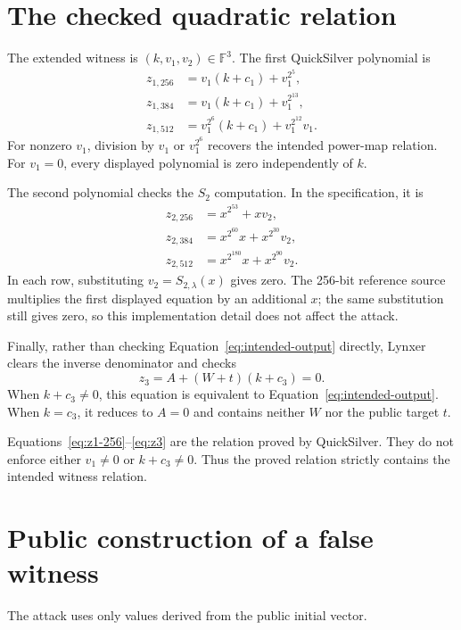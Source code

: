 \documentclass[11pt,a4paper]{article}
\newcommand{\F}{\mathbb{F}}
\begin{document}
\section{The checked quadratic relation}

The extended witness is $(k,v_1,v_2)\in\F^3$.  The first QuickSilver polynomial is
\begin{align}
 z_{1,256} &= v_1(k+c_1)+v_1^{2^5}, \label{eq:z1-256}\\
 z_{1,384} &= v_1(k+c_1)+v_1^{2^{13}}, \label{eq:z1-384}\\
 z_{1,512} &= v_1^{2^6}(k+c_1)+v_1^{2^{12}}v_1. \label{eq:z1-512}
\end{align}
For nonzero $v_1$, division by $v_1$ or $v_1^{2^6}$ recovers the intended power-map
relation.  For $v_1=0$, every displayed polynomial is zero independently of $k$.

The second polynomial checks the $S_2$ computation.  In the specification, it is
\begin{align}
 z_{2,256} &= x^{2^{53}}+xv_2, \\
 z_{2,384} &= x^{2^{60}}x+x^{2^{30}}v_2, \\
 z_{2,512} &= x^{2^{180}}x+x^{2^{90}}v_2. \label{eq:z2}
\end{align}
In each row, substituting $v_2=S_{2,\lambda}(x)$ gives zero.  The 256-bit reference source multiplies the first displayed equation by an additional $x$;
the same substitution still gives zero, so this implementation detail does not affect the
attack.

Finally, rather than checking Equation~\eqref{eq:intended-output} directly, Lynxer clears
the inverse denominator and checks
\begin{equation}
 z_3=A+(W+t)(k+c_3)=0.
 \label{eq:z3}
\end{equation}
When $k+c_3\neq0$, this equation is equivalent to Equation~\eqref{eq:intended-output}.
When $k=c_3$, it reduces to $A=0$ and contains neither $W$ nor the public target $t$.

Equations~\eqref{eq:z1-256}--\eqref{eq:z3} are the relation proved by QuickSilver.  They
do not enforce either $v_1\neq0$ or $k+c_3\neq0$.  Thus the proved relation strictly
contains the intended witness relation.

\section{Public construction of a false witness}

The attack uses only values derived from the public initial vector.
\end{document}
